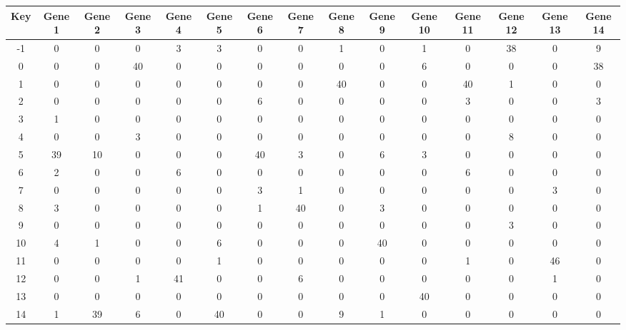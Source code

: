 \begin{tabular}{|c|c|c|c|c|c|c|c|c|c|c|c|c|c|c|}
\hline
Key & Gene 1 & Gene 2 & Gene 3 & Gene 4 & Gene 5 & Gene 6 & Gene 7 & Gene 8 & Gene 9 & Gene 10 & Gene 11 & Gene 12 & Gene 13 & Gene 14 \\
\hline
-1 & 0 & 0 & 0 & 3 & 3 & 0 & 0 & 1 & 0 & 1 & 0 & 38 & 0 & 9 \\
0 & 0 & 0 & 40 & 0 & 0 & 0 & 0 & 0 & 0 & 6 & 0 & 0 & 0 & 38 \\
1 & 0 & 0 & 0 & 0 & 0 & 0 & 0 & 40 & 0 & 0 & 40 & 1 & 0 & 0 \\
2 & 0 & 0 & 0 & 0 & 0 & 6 & 0 & 0 & 0 & 0 & 3 & 0 & 0 & 3 \\
3 & 1 & 0 & 0 & 0 & 0 & 0 & 0 & 0 & 0 & 0 & 0 & 0 & 0 & 0 \\
4 & 0 & 0 & 3 & 0 & 0 & 0 & 0 & 0 & 0 & 0 & 0 & 8 & 0 & 0 \\
5 & 39 & 10 & 0 & 0 & 0 & 40 & 3 & 0 & 6 & 3 & 0 & 0 & 0 & 0 \\
6 & 2 & 0 & 0 & 6 & 0 & 0 & 0 & 0 & 0 & 0 & 6 & 0 & 0 & 0 \\
7 & 0 & 0 & 0 & 0 & 0 & 3 & 1 & 0 & 0 & 0 & 0 & 0 & 3 & 0 \\
8 & 3 & 0 & 0 & 0 & 0 & 1 & 40 & 0 & 3 & 0 & 0 & 0 & 0 & 0 \\
9 & 0 & 0 & 0 & 0 & 0 & 0 & 0 & 0 & 0 & 0 & 0 & 3 & 0 & 0 \\
10 & 4 & 1 & 0 & 0 & 6 & 0 & 0 & 0 & 40 & 0 & 0 & 0 & 0 & 0 \\
11 & 0 & 0 & 0 & 0 & 1 & 0 & 0 & 0 & 0 & 0 & 1 & 0 & 46 & 0 \\
12 & 0 & 0 & 1 & 41 & 0 & 0 & 6 & 0 & 0 & 0 & 0 & 0 & 1 & 0 \\
13 & 0 & 0 & 0 & 0 & 0 & 0 & 0 & 0 & 0 & 40 & 0 & 0 & 0 & 0 \\
14 & 1 & 39 & 6 & 0 & 40 & 0 & 0 & 9 & 1 & 0 & 0 & 0 & 0 & 0 \\
\hline
\end{tabular}